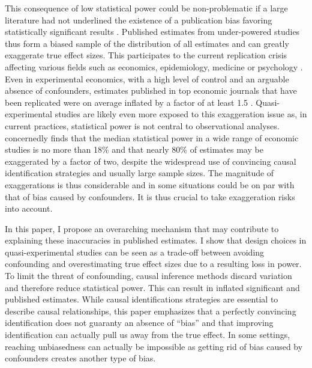 			This consequence of low statistical power could be non-problematic if a large literature had not underlined the existence of a publication bias favoring statistically significant results \citep[for instance]{rosenthal_file_1979, andrews_identification_2019, abadie_statistical_2020, brodeur_methods_2020}. Published estimates from under-powered studies thus form a biased sample of the distribution of all estimates and can greatly exaggerate true effect sizes. This participates to the current replication crisis affecting various fields such as economics, epidemiology, medicine or psychology \citep{button_power_2013, open_science_collaboration_estimating_2015, camerer_evaluating_2016, chang_is_2022}. Even in experimental economics, with a high level of control and an arguable absence of confounders, estimates published in top economic journals that have been replicated were on average inflated by a factor of at least 1.5 \citep{camerer_evaluating_2016}. Quasi-experimental studies are likely even more exposed to this exaggeration issue as, in current practices, statistical power is not central to observational analyses. \cite{ioannidis_power_2017} concernedly finds that the median statistical power in a wide range of economic studies is no more than 18\% and that nearly 80\% of estimates may be exaggerated by a factor of two, despite the widespread use of convincing causal identification strategies and usually large sample sizes. The magnitude of exaggerations is thus considerable and in some situations could be on par with that of bias caused by confounders. It is thus crucial to take exaggeration risks into account.%
			
			In this paper, I propose an overarching mechanism that may contribute to explaining these inaccuracies in published estimates. I show that design choices in quasi-experimental studies can be seen as a trade-off between avoiding confounding and overestimating true effect sizes due to a resulting loss in power. To limit the threat of confounding, causal inference methods discard variation and therefore reduce statistical power. This can result in inflated significant and published estimates. While causal identifications strategies are essential to describe causal relationships, this paper emphasizes that a perfectly convincing identification does not guaranty an absence of ``bias'' and that improving identification can actually pull us away from the true effect. In some settings, reaching unbiasedness can actually be impossible as getting rid of bias caused by confounders creates another type of bias. 
			
